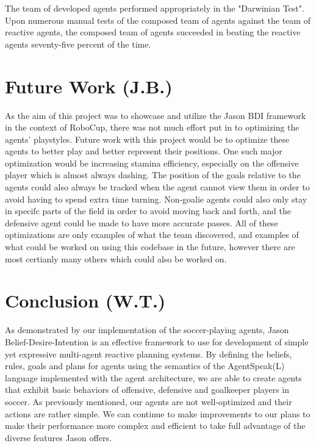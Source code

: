 \documentclass[conference]{IEEEtran}
\begin{document}
The team of developed agents performed appropriately in the "Darwinian Test".
Upon numerous manual tests of the composed team of agents against the team of reactive agents, the composed team of agents succeeded in beating the reactive agents seventy-five percent of the time.


\section{Future Work (J.B.)}
As the aim of this project was to showcase and utilize the Jason BDI framework in the context of RoboCup, there was not much effort put in to optimizing the agents' playstyles.
Future work with this project would be to optimize these agents to better play and better represent their positions.
One such major optimization would be increasing stamina efficiency, especially on the offensive player which is almost always dashing.
The position of the goals relative to the agents could also always be tracked when the agent cannot view them in order to avoid having to spend extra time turning.
Non-goalie agents could also only stay in specifc parts of the field in order to avoid moving back and forth, and the defensive agent could be made to have more accurate passes.
All of these optimizations are only examples of what the team discovered, and examples of what could be worked on using this codebase in the future, however there are most certianly many others which could also be worked on.

\section{Conclusion (W.T.)}
As demonstrated by our implementation of the soccer-playing agents, Jason Belief-Desire-Intention is an effective framework to use for development of simple yet expressive multi-agent reactive planning systems.
By defining the beliefs, rules, goals and plans for agents using the semantics of the AgentSpeak(L) language implemented with the agent architecture, we are able to create agents that exhibit basic behaviors of offensive, defensive and goalkeeper players in soccer.
As previously mentioned, our agents are not well-optimized and their actions are rather simple.
We can continue to make improvements to our plans to make their performance more complex and efficient to take full advantage of the diverse features Jason offers.
\end{document}
